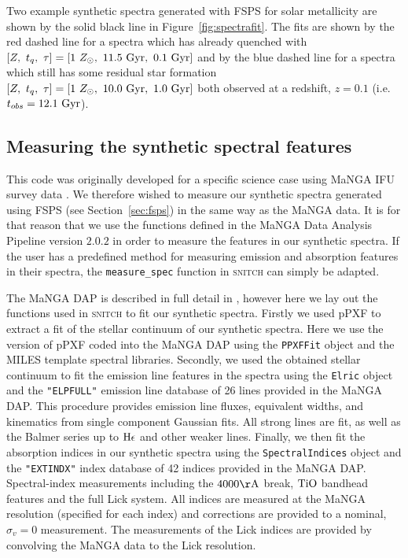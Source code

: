 \documentclass[useAMS,usenatbib]{mn2e}
\begin{document}
Two example synthetic spectra generated with FSPS for solar metallicity are shown by the solid black line in Figure~\ref{fig:spectrafit}. The fits are shown by the red dashed line for a spectra which has already quenched with $[Z,~t_q,~\tau] = [1~Z_{\odot},~11.5~\rm{Gyr},~0.1~\rm{Gyr}]$ and by the blue dashed line for a spectra which still has some residual star formation $[Z,~t_q,~\tau] = [1~Z_{\odot},~10.0~\rm{Gyr},~1.0~\rm{Gyr}]$ both observed at a redshift, $z=0.1$ (i.e. $t_{obs}=12.1~\rm{Gyr}$). 

\subsection{Measuring the synthetic spectral features}\label{sec:dap}

This code was originally developed for a specific science case using MaNGA IFU survey data \citep[an integral-field spectroscopic survey of 10,000 galaxies undertaken by the fourth phase of the Sloan Digital Sky Survey, SDSS-IV; ][]{bundy15}. We therefore wished to measure our synthetic spectra generated using FSPS (see Section~\ref{sec:fsps}) in the same way as the MaNGA data. It is for that reason that we use the functions defined in the MaNGA Data Analysis Pipeline \citep[DAP;][]{westfall18} version $2.0.2$ in order to measure the features in our synthetic spectra. If the user has a predefined method for measuring emission and absorption features in their spectra, the \texttt{measure\_spec} function in \textsc{snitch} can simply be adapted.

The MaNGA DAP is described in full detail in \cite{westfall18}, however here we lay out the functions used in \textsc{snitch} to fit our synthetic spectra. Firstly we used pPXF \citep{cappellari04} to extract a fit of the stellar continuum of our synthetic spectra. Here we use the version of pPXF coded into the MaNGA DAP using the \texttt{PPXFFit} object and the MILES template spectral libraries. Secondly, we used the obtained stellar continuum to fit the emission line features in the spectra using the \texttt{Elric} object and the \texttt{"ELPFULL"} emission line database of 26 lines provided in the MaNGA DAP. This procedure provides emission line fluxes, equivalent widths, and kinematics from single component Gaussian fits. All strong lines are fit, as well as the Balmer series up to $\rm{H}\epsilon$ and other weaker lines. Finally, we then fit the absorption indices in our synthetic spectra using the \texttt{SpectralIndices} object and the \texttt{"EXTINDX"} index database of 42 indices provided in the MaNGA DAP. Spectral-index measurements including the $4000\rm{\AA}$ break, $\rm{TiO}$ bandhead features and the full Lick system. All indices are measured at the MaNGA resolution (specified for each index) and corrections are provided to a nominal, $\sigma_v = 0$ measurement. The measurements of the Lick indices are provided by convolving the MaNGA data to the Lick resolution. 
\end{document}
